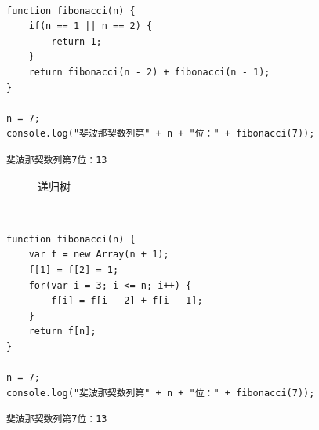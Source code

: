 \\

\begin{lstlisting}[style=htmlcssjs]
function fibonacci(n) {
    if(n == 1 || n == 2) {
        return 1;
    }
    return fibonacci(n - 2) + fibonacci(n - 1);
}

n = 7;
console.log("斐波那契数列第" + n + "位：" + fibonacci(7));
\end{lstlisting}

\begin{tcolorbox}
	\begin{verbatim}
斐波那契数列第7位：13
	\end{verbatim}
\end{tcolorbox}

\begin{figure}[H]
	\centering
	\caption{递归树}
\end{figure}

\\

\begin{lstlisting}[style=htmlcssjs]
function fibonacci(n) {
    var f = new Array(n + 1);
    f[1] = f[2] = 1;
    for(var i = 3; i <= n; i++) {
        f[i] = f[i - 2] + f[i - 1];
    }
    return f[n];
}

n = 7;
console.log("斐波那契数列第" + n + "位：" + fibonacci(7));
\end{lstlisting}

\begin{tcolorbox}
	\begin{verbatim}
斐波那契数列第7位：13
	\end{verbatim}
\end{tcolorbox}

